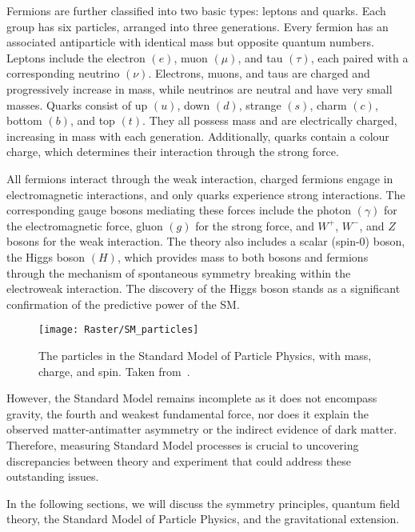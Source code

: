     Fermions are further classified into two basic types: leptons and quarks. 
    Each group has six particles, arranged into three generations. Every 
    fermion has an associated antiparticle with identical mass but opposite 
    quantum numbers. Leptons include the electron $(e)$, muon $(\mu)$, and tau $(\tau)$, 
    each paired with a corresponding neutrino $(\nu)$. Electrons, muons, 
    and taus are charged and progressively increase in mass, while neutrinos 
    are neutral and have very small masses. Quarks consist of up $(u)$, down $(d)$, 
    strange $(s)$, charm $(c)$, bottom $(b)$, and top $(t)$. They all possess 
    mass and are electrically charged, increasing in mass with each generation. 
    Additionally, quarks contain a colour charge, which determines their interaction 
    through the strong force.

    All fermions interact through the weak interaction, charged fermions engage 
    in electromagnetic interactions, and only quarks experience strong interactions. 
    The corresponding gauge bosons mediating these forces include the photon $(\gamma)$ 
    for the electromagnetic force, gluon $(g)$ for the strong force, and $W^+$, $W^-$, 
    and $Z$ bosons for the weak interaction. The theory also includes a scalar (spin-0) 
    boson, the Higgs boson $(H)$, which provides mass to both bosons and fermions 
    through the mechanism of spontaneous symmetry breaking within the electroweak 
    interaction. The discovery of the Higgs boson stands as a significant confirmation 
    of the predictive power of the SM. 

    \begin{figure}[htbp]
        \centering
        \texttt{[image: Raster/SM\_particles]}
        \caption{
            The particles in the Standard Model of Particle Physics, with mass, charge, and spin. Taken from~\cite{quanta-magazine-2020}.
        }
        \label{fig:SM_particles}
    \end{figure}

    However, the Standard Model remains incomplete as it does not encompass gravity, 
    the fourth and weakest fundamental force, nor does it explain the observed 
    matter-antimatter asymmetry or the indirect evidence of dark matter. Therefore, 
    measuring Standard Model processes is crucial to uncovering discrepancies 
    between theory and experiment that could address these outstanding issues.

    In the following sections, we will discuss the symmetry principles,
    quantum field theory, the Standard Model of Particle Physics, and the gravitational extension.
    
